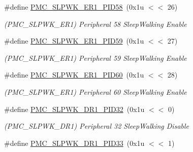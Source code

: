 \begin{DoxyCompactItemize}
\mbox{\label{group__SAMV71__PMC_ga7fdf8770dbdad26596591bc1cee4dcbd}} 
\#define \mbox{\hyperlink{group__SAMV71__PMC_ga7fdf8770dbdad26596591bc1cee4dcbd}{P\+M\+C\+\_\+\+S\+L\+P\+W\+K\+\_\+\+E\+R1\+\_\+\+P\+I\+D58}}~(0x1u $<$$<$ 26)
\begin{DoxyCompactList}\small\item\em (P\+M\+C\+\_\+\+S\+L\+P\+W\+K\+\_\+\+E\+R1) Peripheral 58 Sleep\+Walking Enable \end{DoxyCompactList}\item 
\mbox{\label{group__SAMV71__PMC_ga1519c9318deeedd834662d5ad7374bf1}} 
\#define \mbox{\hyperlink{group__SAMV71__PMC_ga1519c9318deeedd834662d5ad7374bf1}{P\+M\+C\+\_\+\+S\+L\+P\+W\+K\+\_\+\+E\+R1\+\_\+\+P\+I\+D59}}~(0x1u $<$$<$ 27)
\begin{DoxyCompactList}\small\item\em (P\+M\+C\+\_\+\+S\+L\+P\+W\+K\+\_\+\+E\+R1) Peripheral 59 Sleep\+Walking Enable \end{DoxyCompactList}\item 
\mbox{\label{group__SAMV71__PMC_ga780fe16c095a2bc0502c5a43bebea374}} 
\#define \mbox{\hyperlink{group__SAMV71__PMC_ga780fe16c095a2bc0502c5a43bebea374}{P\+M\+C\+\_\+\+S\+L\+P\+W\+K\+\_\+\+E\+R1\+\_\+\+P\+I\+D60}}~(0x1u $<$$<$ 28)
\begin{DoxyCompactList}\small\item\em (P\+M\+C\+\_\+\+S\+L\+P\+W\+K\+\_\+\+E\+R1) Peripheral 60 Sleep\+Walking Enable \end{DoxyCompactList}\item 
\mbox{\label{group__SAMV71__PMC_gac3df64c7f8916cf9325762a80fd9ee80}} 
\#define \mbox{\hyperlink{group__SAMV71__PMC_gac3df64c7f8916cf9325762a80fd9ee80}{P\+M\+C\+\_\+\+S\+L\+P\+W\+K\+\_\+\+D\+R1\+\_\+\+P\+I\+D32}}~(0x1u $<$$<$ 0)
\begin{DoxyCompactList}\small\item\em (P\+M\+C\+\_\+\+S\+L\+P\+W\+K\+\_\+\+D\+R1) Peripheral 32 Sleep\+Walking Disable \end{DoxyCompactList}\item 
\mbox{\label{group__SAMV71__PMC_ga707ff967774e6bb8804d0fbaad7cee81}} 
\#define \mbox{\hyperlink{group__SAMV71__PMC_ga707ff967774e6bb8804d0fbaad7cee81}{P\+M\+C\+\_\+\+S\+L\+P\+W\+K\+\_\+\+D\+R1\+\_\+\+P\+I\+D33}}~(0x1u $<$$<$ 1)
$$
\end{DoxyCompactItemize}
